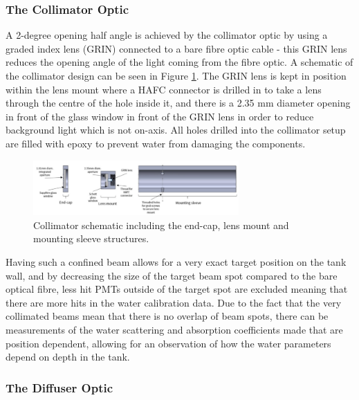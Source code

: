 \subsubsection{The Collimator Optic}

A 2-degree opening half angle is achieved by the collimator optic by using a graded index lens (GRIN) connected to a bare fibre optic cable - this GRIN lens reduces the opening angle of the light coming from the fibre optic. A schematic of the collimator design can be seen in Figure \ref{fig:collimator_schematic}. The GRIN lens is kept in position within the lens mount where a HAFC connector is drilled in to take a lens through the centre of the hole inside it, and there is a 2.35 mm diameter opening in front of the glass window in front of the GRIN lens in order to reduce background light which is not on-axis. All holes drilled into the collimator setup are filled with epoxy to prevent water from damaging the components. 

\begin{figure}
    \centering
    \includegraphics[width=0.7\textwidth]{Figures/collimator_schematic.png}
    \caption{Collimator schematic including the end-cap, lens mount and mounting sleeve structures.}
    \label{fig:collimator_schematic}
\end{figure}

Having such a confined beam allows for a very exact target position on the tank wall, and by decreasing the size of the target beam spot compared to the bare optical fibre, less hit PMTs outside of the target spot are excluded meaning that there are more hits in the water calibration data. Due to the fact that the very collimated beams mean that there is no overlap of beam spots, there can be measurements of the water scattering and absorption coefficients made that are position dependent, allowing for an observation of how the water parameters depend on depth in the tank. 

\subsubsection{The Diffuser Optic}

